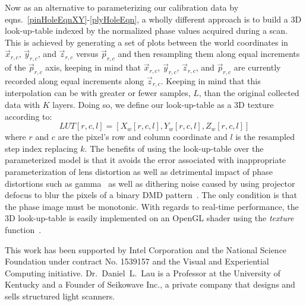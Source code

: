 \documentclass[]{spie}  %
\begin{document}
Now as an alternative to parameterizing our calibration data by eqns.~\eqref{pinHoleEqnXY}-\eqref{plyHoleEqn}, a wholly different approach is to build a 3D look-up-table indexed by the normalized phase values acquired during a scan. This is achieved by generating a set of plots between the world coordinates in $\vec{x}_{r,c}$, $\vec{y}_{r,c}$, and $\vec{z}_{r,c}$ versus $\vec{p}_{r,c}$ and then resampling them along equal increments of the $\vec{p}_{r,c}$ axis, keeping in mind that $\vec{x}_{r,c}$, $\vec{y}_{r,c}$, $\vec{z}_{r,c}$, and $\vec{p}_{r,c}$ are currently recorded along equal increments along $\vec{z}_{r,c}$.  Keeping in mind that this interpolation can be with greater or fewer samples, $L$, than the original collected data with $K$ layers.  Doing so, we define our look-up-table as a 3D texture according to:
\begin{equation}
LUT[r,c,l] = [X_w[r,c,l], Y_w[r,c,l], Z_w[r,c,l]]
\end{equation}
where $r$ and $c$ are the pixel's row and column coordinate and $l$ is the resampled step index replacing $k$. The benefits of using the look-up-table over the parameterized model is that it avoids the error associated with inappropriate parameterization of lens distortion as well as detrimental impact of phase distortions such as gamma~\cite{??} as well as dithering noise caused by using projector defocus to blur the pixels of a binary DMD pattern~\cite{??}. The only condition is that the phase image must be monotonic. With regards to real-time performance, the 3D look-up-table is easily implemented on an OpenGL shader using the {\em texture} function~\cite{??}.




\acknowledgments
This work has been supported by Intel Corporation and the National Science Foundation under contract No. 1539157 and the Visual and Experiential Computing initiative. Dr.~Daniel~L.~Lau is a Professor at the University of Kentucky and a Founder of Seikowave Inc., a private company that designs and sells structured light scanners.

\end{document}
